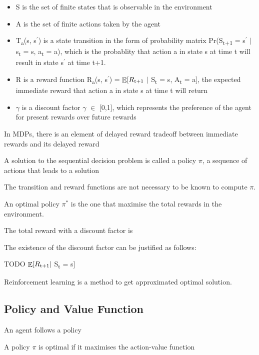 \documentclass[12pt,twoside]{report}
\DeclareMathOperator{\E}{\mathbb{E}}
\begin{document}
\begin{itemize}
\item S is the set of finite states that is observable in the environment
\item A is the set of finite actions taken by the agent
\item T\textsubscript{a}(s, s$^\prime$) is a state transition in the form of probability matrix Pr(S\textsubscript{t+1} = s$^\prime$ $\vert$ s\textsubscript{t} = s, a\textsubscript{t} = a), which is the probablity that action a in state s at time t will result in state s$^\prime$ at time t+1.
\item R is a reward function R\textsubscript{a}(s, s$^\prime$) = $\displaystyle \E[R\textsubscript{t+1} $ $\vert$ S\textsubscript{t} = s, A\textsubscript{t} = a], the expected immediate reward that action a in state s at time t will return
\item $\gamma$ is a discount factor $\gamma$ $\in$ [0,1], which represents the preference of the agent for present rewards over future rewards

\end{itemize}

In MDPs, there is an element of delayed reward tradeoff between immediate rewards and its delayed reward

A solution to the sequential decision problem is called a policy $\pi$, a sequence of actions that leads to a solution

The transition and reward functions are not necessary to be known to compute $\pi$.

An optimal policy $\pi^*$ is the one that maximise the total rewards in the environment.

The total reward with a discount factor is

The existence of the discount factor can be justified as follows:

TODO
$\displaystyle \E[R\textsubscript{t+1} \vert$ S\textsubscript{t} = s]

Reinforcement learning is a method to get approximated optimal solution.

\subsection{Policy and Value Function}

An agent follows a policy


A policy $\pi$ is optimal if it maximises the action-value function
\end{document}
